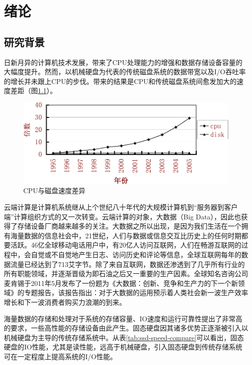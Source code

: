 
\chapter{绪论}
\label{cha:introduction}

\section{研究背景}
\label{sec:background}

日新月异的计算机技术发展，带来了CPU处理能力的增强和数据存储设备容量的大幅度提升。然而，以机械硬盘为代表的传统磁盘系统的数据带宽以及I/O吞吐率的增长并未跟上CPU的步伐。带来的结果是CPU和传统磁盘系统间愈发加大的速度差距\cite{matthews2008intelturbomem}（图\ref{fig:cpu-disk-diff}）。

\begin{figure}[H]
\centering
\includegraphics[width=0.7\linewidth]{./graph/cpu-disk-gap}
\caption{CPU与磁盘速度差异}
\label{fig:cpu-disk-diff}
\end{figure}

云端计算\cite{jimgray2003cloud}是计算机系统继从上个世纪八十年代的大规模计算机到“服务器到客户端”计算组织方式的又一次转变。云端计算的对象，大数据（Big Data），因此也获得了存储设备厂商越来越多的关注。大数据之所以出现，是因为我们生活在一个拥有海量数据的信息社会中，21世纪，人们与数据或信息交互比历史上的任何时期都要活跃。46亿全球移动电话用户中，有20亿人访问互联网，人们在畅游互联网的过程中，会自觉或不自觉地产生日志、访问历史和评论等信息，全球互联网每年的数据流量已经达到了713艾字节。除了来自互联网，数据还渗透到了几乎所有行业的所有职能领域，并逐渐晋级为即石油之后又一重要的生产因素。全球知名咨询公司麦肯锡于2011年5月发布了一份题为《大数据：创新、竞争和生产力的下一个新领域》的专题报告，该报告指出：对于大数据的运用预示着人类社会新一波生产效率增长和下一波消费者购买力浪潮的到来。

海量数据的存储和处理对于系统的存储容量、IO速度和运行可靠性提出了非常高的要求，一些高性能的存储设备由此产生。固态硬盘因其诸多优势正逐渐被引入以机械硬盘为主导的传统存储系统中\cite{morris2003evostorage}。从表\ref{tab:ssd-speed-compare}可以看出，固态硬盘的IO性能，尤其是读性能，远高于机械硬盘\cite{libo2010cacheforssd}，引入固态硬盘到传统存储系统可在一定程度上提高系统的I/O性能。

